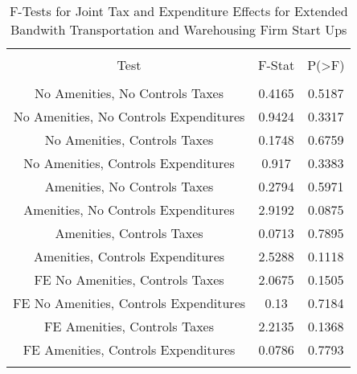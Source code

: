 
\begin{table}[!htbp] \centering 
  \caption{F-Tests for Joint Tax and Expenditure Effects for Extended Bandwith Transportation and Warehousing Firm Start Ups} 
  \label{48-49Ftests} 
\begin{tabular}{@{\extracolsep{5pt}} ccc} 
\\[-1.8ex]\hline 
\hline \\[-1.8ex] 
Test & F-Stat & P(\textgreater F) \\ 
\hline \\[-1.8ex] 
No Amenities, No Controls Taxes & 0.4165 & 0.5187 \\ 
No Amenities, No Controls Expenditures & 0.9424 & 0.3317 \\ 
No Amenities, Controls Taxes & 0.1748 & 0.6759 \\ 
No Amenities, Controls Expenditures & 0.917 & 0.3383 \\ 
Amenities, No Controls Taxes & 0.2794 & 0.5971 \\ 
Amenities, No Controls Expenditures & 2.9192 & 0.0875 \\ 
Amenities, Controls Taxes & 0.0713 & 0.7895 \\ 
Amenities, Controls Expenditures & 2.5288 & 0.1118 \\ 
FE No Amenities, Controls Taxes & 2.0675 & 0.1505 \\ 
FE No Amenities, Controls Expenditures & 0.13 & 0.7184 \\ 
FE Amenities, Controls Taxes & 2.2135 & 0.1368 \\ 
FE Amenities, Controls Expenditures & 0.0786 & 0.7793 \\ 
\hline \\[-1.8ex] 
\end{tabular} 
\end{table} 
